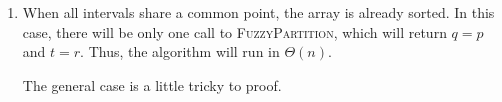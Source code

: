 \documentclass{report}
\makeatletter
\renewenvironment{framed}{%
 \def\FrameCommand##1{\hskip\@totalleftmargin
 \fboxsep=\FrameSep\fbox{##1}}%
 \MakeFramed {\advance\hsize-\width
   \@totalleftmargin\z@ \linewidth\hsize
   \@setminipage}}%
 {\par\unskip\endMakeFramed}
\let\oldnl\nl%
\newcommand{\nonl}{\renewcommand{\nl}{\let\nl\oldnl}}%
\makeatother
\begin{document}
\begin{enumerate}
\begin{framed}
\begin{enumerate}
{\begin{algorithm}[H]
\SetAlgoNoEnd\DontPrintSemicolon
\BlankLine
{}
\nonl{}
\end{algorithm}

\begin{algorithm}[H]
\SetAlgoNoEnd\DontPrintSemicolon
\BlankLine
{}
\nonl{}
\end{algorithm}
}

\newpage

\item{When all intervals share a common point, the array is already sorted. In
this case, there will be only one call to \textsc{FuzzyPartition}, which will
return $q = p$ and $t = r$. Thus, the algorithm will run in $\Theta(n)$.

The general case is a little tricky to proof.}
\end{enumerate}
\end{framed}

\end{enumerate}
\end{document}
